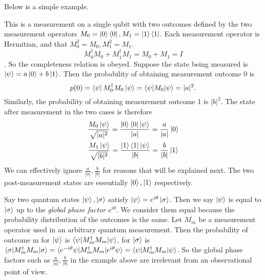 Below is a simple example.
\begin{example} \label{measurement-standard basis}
This is a measurement on a single qubit with two outcomes defined by the two measurement operators $M_0=\ket{0}\bra{0}, M_1=\ket{1}\bra{1}$. Each measurement operator is Hermitian, and that $M_0^2=M_0, M_1^2=M_1$. 
\begin{equation*}
    M_0^\dagger M_0+M_1^\dagger M_1 = M_0 + M_1 = I
\end{equation*}.
So the completeness relation is obeyed. Suppose the state being measured is $\ket{\psi}=a\ket{0}+b\ket{1}$. Then the probability of obtaining measurement outcome 0 is
\begin{equation*}
    p(0) = \bra{\psi}M_0^\dagger M_0 \ket{\psi} = \braket{\psi | M_0 | \psi}=|a|^2.
\end{equation*}
Similarly, the probability of obtaining measurement outcome 1 is $|b|^2$.
The state after measurement in the two cases is therefore
\begin{gather*}
    \frac{M_0 \ket{\psi}}{\sqrt{|a|^2}}=\frac{\ket{0}\bra{0}\ket{\psi}}{|a|}=\frac{a}{|a|}\ket{0}\\
    \frac{M_1 \ket{\psi}}{\sqrt{|b|^2}}=\frac{\ket{1}\bra{1}\ket{\psi}}{|b|}=\frac{b}{|b|}\ket{1}\\   
\end{gather*}
We can effectively ignore $\frac{a}{|a|}, \frac{b}{|b|}$ for reasons that will be explained next. The two post-measurement states are essentially $\ket{0}, \ket{1}$ respectively.
\end{example}

Say two quantum states $\ket{\psi}, \ket{\sigma}$ satisfy $\ket{\psi}=e^{i\theta}\ket{\sigma}$. Then we say $\ket{\psi}$ is equal to $\ket{\sigma}$ up to the \textit{global phase factor $e^{i\theta}$}. We consider them equal because the probability distribution of the outcomes is the same. Let $M_m$ be a measurement operator used in an arbitrary quantum measurement. Then the probability of outcome m for $\ket{\psi}$ is $\braket{\psi|M_m^\dagger M_m|\psi}$, for $\ket{\sigma}$ is $\braket{\sigma|M_m^\dagger M_m|\sigma}=\braket{e^{-i\theta}\psi|M_m^\dagger M_m|e^{i\theta}\psi}=\braket{\psi|M_m^\dagger M_m|\psi}$.
So the global phase factors such as $\frac{a}{|a|}, \frac{b}{|b|}$ in the example above are irrelevant from an observational point of view.

